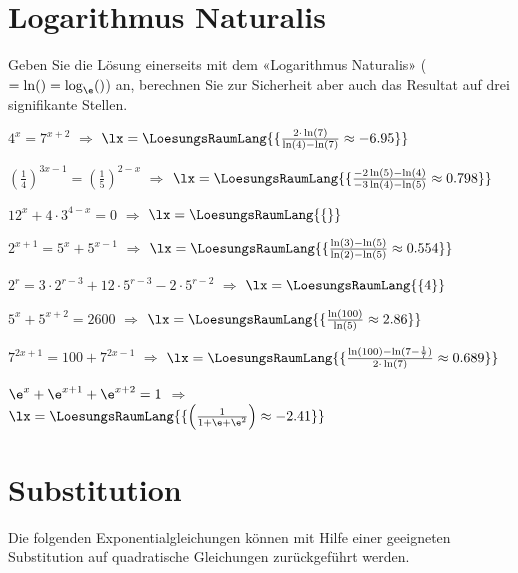 \platzFuerBerechnungenBisEndeSeite{}


\section{Logarithmus Naturalis}
Geben Sie die Lösung einerseits mit dem «Logarithmus Naturalis»
($=\ln() = \log_{\e}()$) an, berechnen Sie zur Sicherheit aber auch das
Resultat auf drei signifikante Stellen.

\begin{bbwAufgabenBlock}
\item $4^x=7^{x+2}$ $\Longrightarrow$ $\lx=\LoesungsRaumLang{\{\frac{2\cdot{}\ln(7)}{\ln(4)-\ln(7)} \approx -6.95   \}}$ \plz{}
\item $\left(\frac14\right)^{3x-1} = \left(\frac15\right)^{2-x}$ $\Longrightarrow$ $\lx=\LoesungsRaumLang{\{\frac{-2\ln(5)-\ln(4)}{-3\ln(4)-\ln(5)} \approx 0.798   \}}$ \plz{}
\item $12^x+4\cdot{}3^{4-x}=0$ $\Longrightarrow$
$\lx=\LoesungsRaumLang{\{   \}}$  \plz{} \noTRAINER{\newpage}
\item $2^{x+1}=5^x + 5^{x-1}$ $\Longrightarrow$ $\lx=\LoesungsRaumLang{\{\frac{\ln(3)-\ln(5)}{\ln(2)-\ln(5)} \approx 0.554   \}}$ \plz{}
\item $2^r=3\cdot{}2^{r-3} + 12\cdot{}5^{r-3} - 2\cdot{}5^{r-2}$ $\Longrightarrow$ $\lx=\LoesungsRaumLang{\{ 4 \}}$ \plz{}
\item $5^x + 5^{x+2} = 2600$ $\Longrightarrow$ $\lx=\LoesungsRaumLang{\{\frac{\ln(100)}{\ln(5)} \approx 2.86   \}}$ \plz{}
\item $7^{2x+1} = 100 + 7^{2x-1}$ $\Longrightarrow$ $\lx=\LoesungsRaumLang{\{\frac{\ln(100) - \ln(7-\frac17)}{2\cdot{}\ln(7)} \approx  0.689  \}}$ \plz{}\noTRAINER{\newpage}
\item $\e^x + \e^{x+1} + \e^{x+2} = 1$ $\Longrightarrow$ $\lx=\LoesungsRaumLang{\{\left(\frac{1}{1+\e+\e^2}\right) \approx -2.41  \}}$ \plz{}

\end{bbwAufgabenBlock}

\platzFuerBerechnungenBisEndeSeite{}

\section{Substitution}
Die folgenden Exponentialgleichungen können mit Hilfe einer geeigneten
Substitution auf quadratische Gleichungen zurückgeführt werden.

